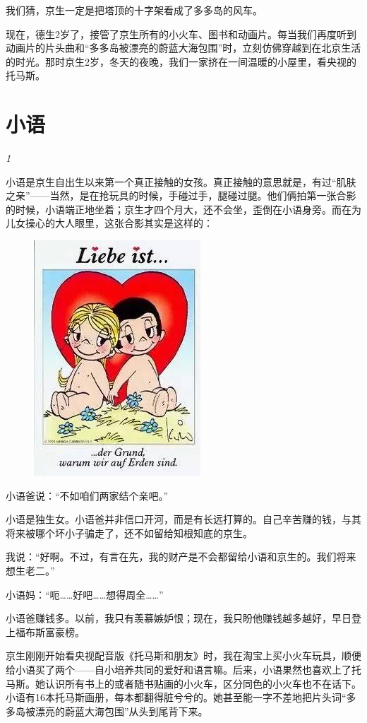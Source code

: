 \documentclass[twoside,openright,headings=optiontohead]{ctexbook} %
\begin{document}
{我们猜，京生一定是把塔顶的十字架看成了多多岛的风车。

现在，德生2岁了，接管了京生所有的小火车、图书和动画片。每当我们再度听到动画片的片头曲和``多多岛被漂亮的蔚蓝大海包围''时，立刻仿佛穿越到在北京生活的时光。那时京生2岁，冬天的夜晚，我们一家挤在一间温暖的小屋里，看央视的托马斯。

\chapter*{小语}\label{puppy-love}

\emph{1}

小语是京生自出生以来第一个真正接触的女孩。真正接触的意思就是，有过``肌肤之亲''------当然，是在抢玩具的时候，手碰过手，腿碰过腿。他们俩拍第一张合影的时候，小语端正地坐着；京生才四个月大，还不会坐，歪倒在小语身旁。而在为儿女操心的大人眼里，这张合影其实是这样的：

\begin{figure}

{\centering \includegraphics[width=0.3\linewidth]{images/xiaoyu1} 

}

\end{figure}

小语爸说：``不如咱们两家结个亲吧。''

小语是独生女。小语爸并非信口开河，而是有长远打算的。自己辛苦赚的钱，与其将来被哪个坏小子骗走了，还不如留给知根知底的京生。

我说：``好啊。不过，有言在先，我的财产是不会都留给小语和京生的。我们将来想生老二。''

小语妈：``呃\ldots{}\ldots{}好吧\ldots{}\ldots{}想得周全\ldots{}\ldots{}''

小语爸赚钱多。以前，我只有羡慕嫉妒恨；现在，我只盼他赚钱越多越好，早日登上福布斯富豪榜。

京生刚刚开始看央视配音版《托马斯和朋友》时，我在淘宝上买小火车玩具，顺便给小语买了两个------自小培养共同的爱好和语言嘛。后来，小语果然也喜欢上了托马斯。她认识所有书上的或者随书贴画的小火车，区分同色的小火车也不在话下。小语有16本托马斯画册，每本都翻得脏兮兮的。她甚至能一字不差地把片头词``多多岛被漂亮的蔚蓝大海包围''从头到尾背下来。

}
\end{document}
